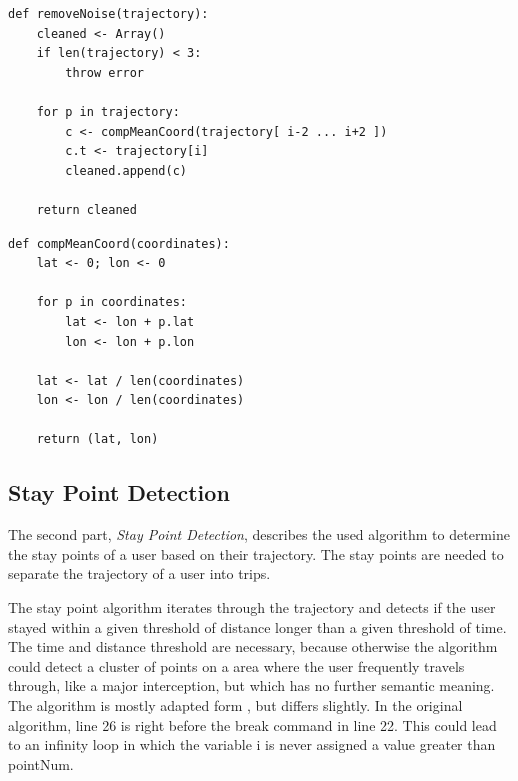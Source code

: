 \begin{lstlisting}[style=py, caption={Pseudocode: Noise Removal \cite{Zheng:2015:TDM:2764959.2743025}}, label={code:noise}]
def removeNoise(trajectory):
    cleaned <- Array()
    if len(trajectory) < 3:
        throw error
    
    for p in trajectory:
        c <- compMeanCoord(trajectory[ i-2 ... i+2 ])
        c.t <- trajectory[i]
        cleaned.append(c)
    
    return cleaned
\end{lstlisting}

\begin{lstlisting}[style=py, caption={Pseudocode: Compute Mean Coordinate \cite{Zheng:2015:TDM:2764959.2743025} }, label={code:meanCoord}]
def compMeanCoord(coordinates):
    lat <- 0; lon <- 0
    
    for p in coordinates:
        lat <- lon + p.lat
        lon <- lon + p.lon
        
    lat <- lat / len(coordinates)
    lon <- lon / len(coordinates)
    
    return (lat, lon)
\end{lstlisting}

\subsection{Stay Point Detection}
The second part, \textit{Stay Point Detection}, describes the used algorithm to determine the stay points of a user based on their trajectory. The stay points are needed to separate the trajectory of a user into trips.

The stay point algorithm iterates through the trajectory and detects if the user stayed within a given threshold of distance longer than a given threshold of time. The time and distance threshold are necessary, because otherwise the algorithm could detect a cluster of points on a area where the user frequently travels through, like a major interception, but which has no further semantic meaning. The algorithm is mostly adapted form \cite{li2008mining}, but differs slightly. In the original algorithm, line 26 is right before the break command in line 22. This could lead to an infinity loop in which the variable i is never assigned a value greater than pointNum. \cite{li2008mining}


\cite{li2008mining}

